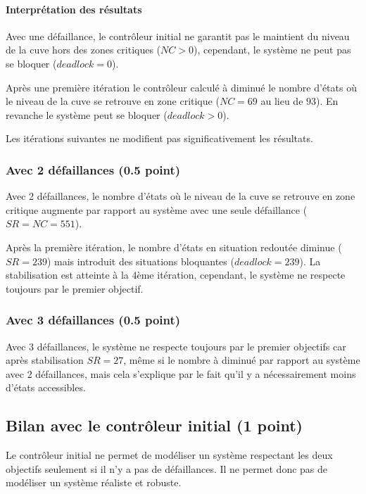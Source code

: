 \documentclass[a4paper]{book}
\begin{document}
\paragraph{Interprétation des résultats}

Avec une défaillance, le contrôleur initial ne garantit pas le maintient du
niveau de la cuve hors des zones critiques ($NC > 0$), cependant, le système ne
peut pas se bloquer ($deadlock = 0$).

Après une première itération le contrôleur calculé à diminué le nombre d'états
où le niveau de la cuve se retrouve en zone critique ($NC = 69$ au lieu de
$93$). En revanche le système peut se bloquer ($deadlock > 0$).

Les itérations suivantes ne modifient pas significativement les résultats.

\subsubsection{Avec 2 défaillances (0.5 point)}

Avec 2 défaillances, le nombre d'états où le niveau de la cuve se retrouve en
zone critique augmente par rapport au système avec une seule défaillance ($SR = NC = 551$).

Après la première itération, le nombre d'états en situation redoutée diminue ($SR = 239$)
mais introduit des situations bloquantes ($deadlock = 239$).
La stabilisation est atteinte à la 4ème itération, cependant, le système ne respecte toujours
par le premier objectif.

\subsubsection{Avec 3 défaillances (0.5 point)}

Avec 3 défaillances, le système ne respecte toujours par le premier objectifs car après
stabilisation $SR = 27$, même si le nombre à diminué par rapport au système avec 2 défaillances,
mais cela s'explique par le fait qu'il y a nécessairement moins d'états accessibles.

\subsection{Bilan avec le contrôleur initial (1 point)}

Le contrôleur initial ne permet de modéliser un système respectant les deux
objectifs seulement si il n'y a pas de défaillances. Il ne permet donc pas de
modéliser un système réaliste et robuste.
\end{document}
